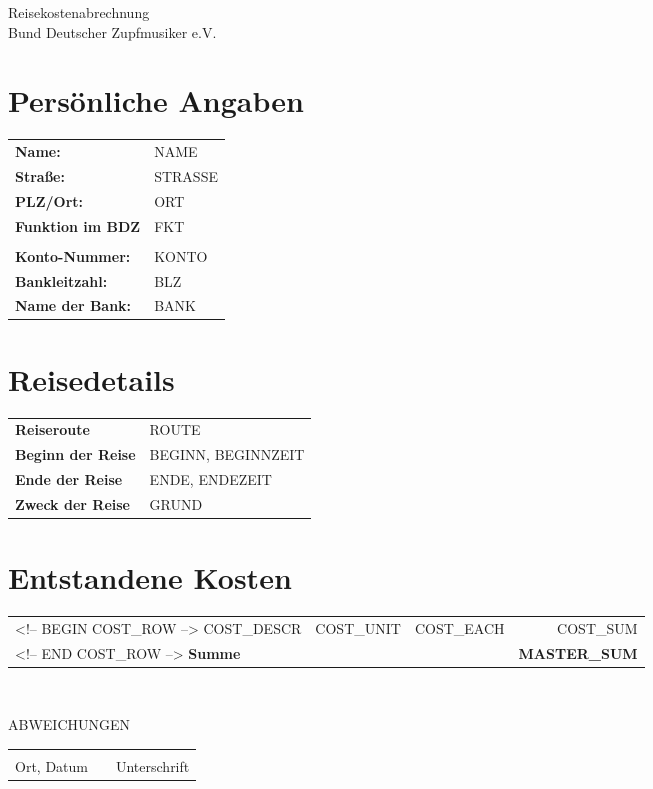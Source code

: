 \documentclass[a4paper,12pt]{article}
\begin{document}

\briefkopf
\setlength{\parindent}{0mm}
\begin{center}
{\huge Reisekostenabrechnung}\\
{\large Bund Deutscher Zupfmusiker e.V.} \\
\end{center}

%
\section{Persönliche Angaben}
\begin{tabular}[t]{ll}
\textbf{Name:} & {NAME} \\
\textbf{Straße:} & {STRASSE} \\
\textbf{PLZ/Ort:} & {ORT} \\
\textbf{Funktion im BDZ} &  {FKT} \\
\\
\textbf{Konto-Nummer:} & {KONTO} \\
\textbf{Bankleitzahl:} & {BLZ} \\
\textbf{Name der Bank:} & {BANK} \\
\end{tabular}
\section{Reisedetails}
\begin{tabular}[t]{ll}
\textbf{Reiseroute} & {ROUTE} \\
\textbf{Beginn der Reise} & {BEGINN}, {BEGINNZEIT} \\
\textbf{Ende der Reise} & {ENDE}, {ENDEZEIT} \\
\textbf{Zweck der Reise} & {GRUND} \\
\end{tabular}
\section{Entstandene Kosten}
\begin{tabular}[t]{lrlr}
<!-- BEGIN COST_ROW -->
{COST_DESCR} & {COST_UNIT} & {COST_EACH} & {COST_SUM} \\
<!-- END COST_ROW -->
\hline
\textbf{Summe} & & & \textbf{ {MASTER_SUM}} \\
\hline
\hline
\end{tabular} \\
\vspace{1cm}

{ABWEICHUNGEN}

\vfill
\begin{tabular}{lp{4em}l}
\hspace{7cm}   && \hspace{7cm} \\
\cline{1-1}\cline{3-3}
 Ort, Datum     && Unterschrift
\end{tabular} 
\end{document}
